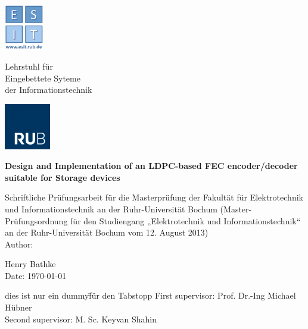 
\begin{titlepage}
	\thispagestyle{empty}
	\begin{minipage}[b][2.5cm][r]{1.8cm}
	\centering
    \includegraphics[height=2cm, keepaspectratio]{Graphic/Logo.png}
	\end{minipage} \hspace{0.5mm}
	\begin{minipage}[b][2cm][l]{10cm}
		\vspace*{\fill}
		{Lehrstuhl für\\
		Eingebettete Syteme\\
		der Informationstechnik}
		\vspace*{\fill}
	\end{minipage} \hspace{5mm}
	\begin{minipage}[b][2.5cm][r]{2.5cm}
	\centering
    \includegraphics[height=2cm, keepaspectratio]{Graphic/RUB.png}
	\end{minipage}	
	
	
	\begin{center}
		\vspace{3cm}
		
		{\Large \textbf{Design and Implementation of an LDPC-based FEC encoder/decoder suitable for Storage devices}}
		
		\vspace{1cm}
		Schriftliche Prüfungsarbeit für die Masterprüfung der Fakultät für Elektrotechnik und Informationstechnik an der Ruhr-Universität Bochum (Master-Prüfungsordnung für den Studiengang „Elektrotechnik und Informationstechnik“ an der Ruhr-Universität Bochum vom 12. August 2013)\\
		\vspace{1cm}
		{
			Author: \\
		}
		
		\vspace{1.5cm}
		{
			Henry Bathke \\
		}
		\vspace{1.5cm}
		Date: \today 
		\vspace{1.5cm}
		
		\begin{tabbing}
			dies ist nur ein dummy\= für den Tabstopp \kill
			First supervisor: \> Prof. Dr.-Ing Michael Hübner \\
			Second supervisor: \> M. Sc. Keyvan Shahin
		\end{tabbing}
		
	\end{center}


\end{titlepage}
